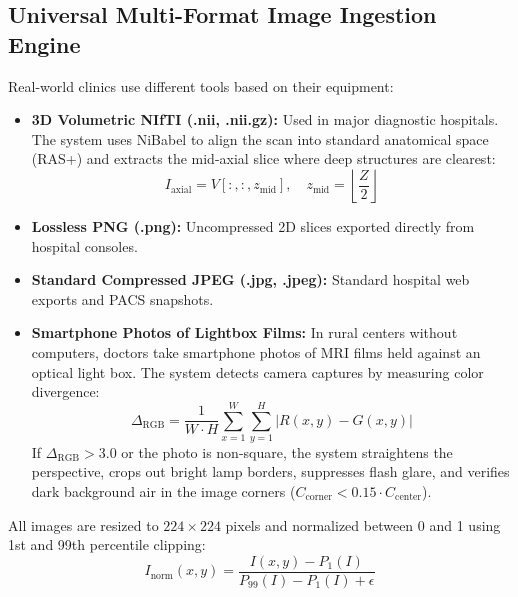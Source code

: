 \documentclass[conference]{IEEEtran}
\begin{document}
\subsection{Universal Multi-Format Image Ingestion Engine}
Real-world clinics use different tools based on their equipment:
\begin{itemize}
    \item \textbf{3D Volumetric NIfTI (.nii, .nii.gz):} Used in major diagnostic hospitals. The system uses NiBabel to align the scan into standard anatomical space (RAS+) and extracts the mid-axial slice where deep structures are clearest:
    \begin{equation}
    I_{\text{axial}} = V[:, :, z_{\text{mid}}], \quad z_{\text{mid}} = \left\lfloor \frac{Z}{2} \right\rfloor \tag{1}
    \end{equation}
    \item \textbf{Lossless PNG (.png):} Uncompressed 2D slices exported directly from hospital consoles.
    \item \textbf{Standard Compressed JPEG (.jpg, .jpeg):} Standard hospital web exports and PACS snapshots.
    \item \textbf{Smartphone Photos of Lightbox Films:} In rural centers without computers, doctors take smartphone photos of MRI films held against an optical light box. The system detects camera captures by measuring color divergence:
    \begin{equation}
    \Delta_{\text{RGB}} = \frac{1}{W \cdot H} \sum_{x=1}^{W} \sum_{y=1}^{H} |R(x, y) - G(x, y)| \tag{2}
    \end{equation}
    If $\Delta_{\text{RGB}} > 3.0$ or the photo is non-square, the system straightens the perspective, crops out bright lamp borders, suppresses flash glare, and verifies dark background air in the image corners ($C_{\text{corner}} < 0.15 \cdot C_{\text{center}}$).
\end{itemize}

All images are resized to $224 \times 224$ pixels and normalized between 0 and 1 using 1st and 99th percentile clipping:
\begin{equation}
I_{\text{norm}}(x, y) = \frac{I(x, y) - P_1(I)}{P_{99}(I) - P_1(I) + \epsilon} \tag{3}
\end{equation}
\end{document}
